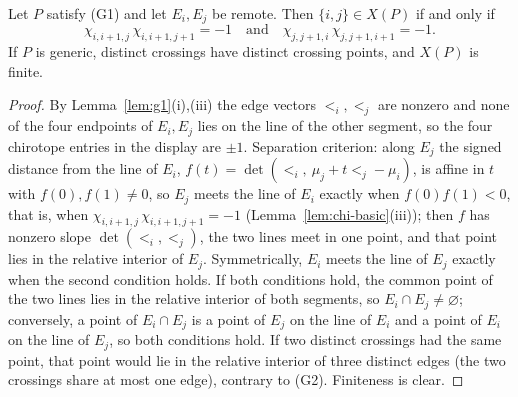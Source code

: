 \begin{lemma}\label{lem:crossing-test}\leanok
Let $P$ satisfy (G1) and let $E_i,E_j$ be remote. Then $\{i,j\}\in X(P)$ if
and only if
\[
\chi_{i,i+1,j}\,\chi_{i,i+1,j+1}=-1\quad\text{and}\quad
\chi_{j,j+1,i}\,\chi_{j,j+1,i+1}=-1.
\]
If $P$ is generic, distinct crossings have distinct crossing points, and
$X(P)$ is finite. 
\end{lemma}
\begin{proof}\leanok{}
By Lemma~\ref{lem:g1}(i),(iii) the edge vectors $\lt_i,\lt_j$ are nonzero and
none of the four endpoints of $E_i,E_j$ lies on the line of the other segment,
so the four chirotope entries in the display are $\pm1$. Separation
criterion: along $E_j$ the signed distance from the line of $E_i$,
$f(t)=\det(\lt_i,\ \mu_j+t\lt_j-\mu_i)$, is affine in $t$ with
$f(0),f(1)\neq0$, so $E_j$ meets the line of $E_i$ exactly when
$f(0)f(1)<0$, that is, when $\chi_{i,i+1,j}\,\chi_{i,i+1,j+1}=-1$
(Lemma~\ref{lem:chi-basic}(iii)); then $f$ has nonzero slope
$\det(\lt_i,\lt_j)$, the two lines meet in one point, and that point lies in
the relative interior of $E_j$. Symmetrically, $E_i$ meets the line of $E_j$
exactly when the second condition holds. If both conditions hold, the common
point of the two lines lies in the relative interior of both segments, so
$E_i\cap E_j\neq\varnothing$; conversely, a point of $E_i\cap E_j$ is a point
of $E_j$ on the line of $E_i$ and a point of $E_i$ on the line of $E_j$, so
both conditions hold. If two distinct crossings had the same point, that
point would lie in the relative interior of three distinct edges (the two
crossings share at most one edge), contrary to (G2). Finiteness is clear.
\end{proof}

